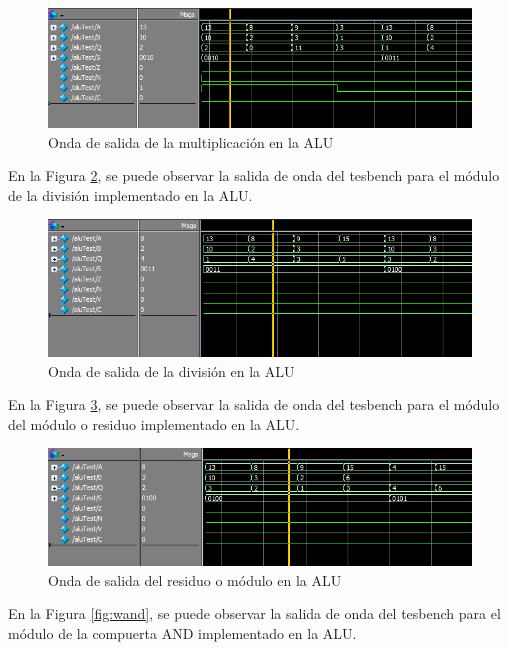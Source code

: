 \documentclass[journal]{IEEEtran}
\begin{document}
	\begin{figure}[hbtp]
		\centering
		\includegraphics[scale = 0.4]{img/wmultiplicacion.png}
		\caption{Onda de salida de la multiplicación en la ALU}
		\label{fig:wmul}
	\end{figure}
	
	En la Figura \ref{fig:wdiv}, se puede observar la salida de onda del tesbench para el módulo de la división implementado en la ALU.
	
	\begin{figure}[hbtp]
		\centering
		\includegraphics[scale = 0.4]{img/wdivision.png}
		\caption{Onda de salida de la división en la ALU}
		\label{fig:wdiv}
	\end{figure}
	
	En la Figura \ref{fig:wmod}, se puede observar la salida de onda del tesbench para el módulo del módulo o residuo implementado en la ALU.
	
	\begin{figure}[hbtp]
		\centering
		\includegraphics[scale = 0.4]{img/wmodulo.png}
		\caption{Onda de salida del residuo o módulo en la ALU}
		\label{fig:wmod}
	\end{figure}
	
	En la Figura \ref{fig:wand}, se puede observar la salida de onda del tesbench para el módulo de la compuerta AND implementado en la ALU.
	
\end{document}
